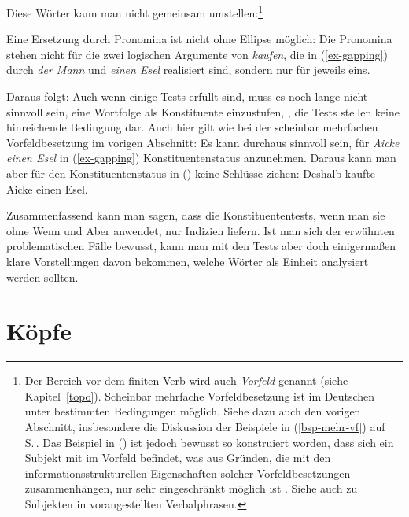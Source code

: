Diese Wörter kann man nicht gemeinsam umstellen:\footnote{
  Der Bereich vor dem finiten Verb wird auch \emph{Vorfeld} genannt (siehe Kapitel~\ref{topo}).
  Scheinbar mehrfache Vorfeldbesetzung ist im Deutschen unter bestimmten
  Bedingungen möglich. Siehe dazu auch den vorigen Abschnitt, insbesondere
  die Diskussion der Beispiele in (\ref{bsp-mehr-vf}) auf S.\,\pageref{bsp-mehr-vf}.
  Das Beispiel in () ist jedoch bewusst so konstruiert worden, 
  dass sich ein Subjekt mit im Vorfeld befindet, was aus Gründen, die 
  mit den informationsstrukturellen Eigenschaften solcher Vorfeldbesetzungen
  zusammenhängen, nur sehr eingeschränkt möglich ist \citep*[]{MBC2012a}. Siehe auch  zu Subjekten
  in vorangestellten Verbalphrasen.%
}
\z

\noindent
Eine Ersetzung durch Pronomina ist nicht ohne Ellipse möglich:
\eal
{}
\zl
Die Pronomina stehen nicht für die zwei logischen Argumente von \emph{kaufen}, die
in (\ref{ex-gapping})  \zb durch \emph{der Mann} und \emph{einen Esel} realisiert sind,
sondern nur für jeweils eins.

Daraus folgt: Auch wenn einige Tests erfüllt sind, muss es noch lange nicht sinnvoll sein,
eine Wortfolge als Konstituente einzustufen, \dash, die Tests stellen keine hinreichende
Bedingung dar. Auch hier gilt wie bei der scheinbar mehrfachen Vorfeldbesetzung im vorigen Abschnitt: Es kann durchaus
sinnvoll sein, für \emph{Aicke einen Esel} in (\ref{ex-gapping}) Konstituentenstatus
anzunehmen. Daraus kann man aber für den Konstituentenstatus in () keine Schlüsse ziehen:
\ea
Deshalb kaufte Aicke einen Esel.
\z

\noindent
Zusammenfassend kann man sagen, dass die Konstituententests, wenn man sie ohne Wenn und Aber
anwendet, nur Indizien liefern. Ist man sich der erwähnten problematischen Fälle bewusst,
kann man mit den Tests aber doch einigermaßen klare Vorstellungen davon bekommen, welche
Wörter als Einheit analysiert werden sollten.

\section{Köpfe}

